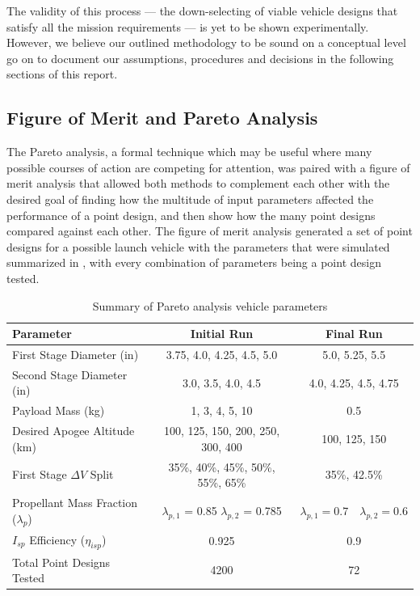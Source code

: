 The validity of this process --- the down-selecting of viable vehicle designs that satisfy all the mission requirements --- is yet to be shown experimentally. However, we believe our outlined methodology to be sound on a conceptual level go on to document our assumptions, procedures and decisions in the following sections of this report.


\subsection{Figure of Merit and Pareto Analysis}
The Pareto analysis, a formal technique which may be useful where many possible courses of action are competing for attention, was paired with a figure of merit analysis that allowed both methods to complement each other with the desired goal of finding how the multitude of input parameters affected the performance of a point design, and then show how the many point designs compared against each other. The figure of merit analysis generated a set of point designs for a possible launch vehicle with the parameters that were simulated summarized in , with every combination of parameters being a point design tested.

\begin{table}
    \centering
    \begin{tabular}{|l|c|c|}
        \hline
        \textbf{Parameter} & \textbf{Initial Run} & \textbf{Final Run} \\ \hline
        First Stage Diameter (in) & 3.75, 4.0, 4.25, 4.5, 5.0 & 5.0, 5.25, 5.5 \\ \hline
        Second Stage Diameter (in) & 3.0, 3.5, 4.0, 4.5 & 4.0, 4.25, 4.5, 4.75 \\ \hline
        Payload Mass (kg) & 1, 3, 4, 5, 10 & 0.5 \\ \hline
        Desired Apogee Altitude (km) & 100, 125, 150, 200, 250, 300, 400 & 100, 125, 150 \\ \hline
        First Stage \(\Delta V\) Split & 35\%, 40\%, 45\%, 50\%, 55\%, 65\% & 35\%, 42.5\% \\ \hline
        Propellant Mass Fraction (\(\lambda_p\)) & \(\lambda_{p,1}\) = 0.85 \quad \(\lambda_{p,2}\) = 0.785 & \(\lambda_{p,1} = 0.7 \quad \lambda_{p,2} = 0.6\) \\ \hline
        \(I_{sp}\) Efficiency (\(\eta_{isp}\)) & 0.925 & 0.9 \\ \hline
        Total Point Designs Tested & 4200 & 72 \\ \hline
    \end{tabular}
    \caption{Summary of Pareto analysis vehicle parameters}
    \label{table:pareto-parameters}
\end{table}


